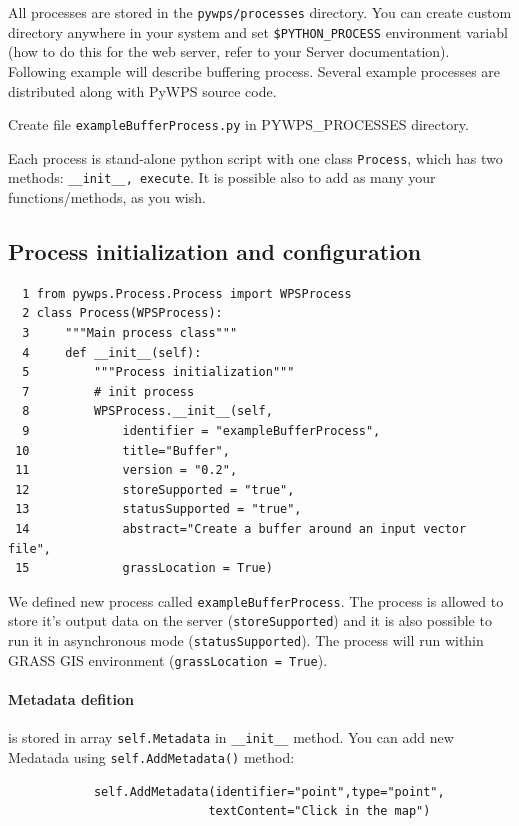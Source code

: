 \documentclass[a4paper,11pt]{article}
\begin{document}
All processes are stored in the \texttt{pywps/processes} directory. You can
create custom directory anywhere in your system and set
\texttt{\$PYTHON\_PROCESS} environment variabl (how to do this for the web
server, refer to your Server documentation). Following example will
describe buffering process.  Several example processes are distributed along with PyWPS source code.

Create file \texttt{exampleBufferProcess.py} in PYWPS\_PROCESSES directory.
    
Each process is stand-alone python script with one class \texttt{Process},
which has two methods: \texttt{\_\_init\_\_, execute}. It is possible also to add as 
many your functions/methods, as you wish.
    
\subsection{Process initialization and configuration}

\begin{verbatim}
  1 from pywps.Process.Process import WPSProcess                                
  2 class Process(WPSProcess):
  3     """Main process class"""
  4     def __init__(self):
  5         """Process initialization"""
  7         # init process
  8         WPSProcess.__init__(self,
  9             identifier = "exampleBufferProcess",
 10             title="Buffer",
 11             version = "0.2",
 12             storeSupported = "true",
 13             statusSupported = "true",
 14             abstract="Create a buffer around an input vector file",
 15             grassLocation = True)
\end{verbatim}

We defined new process called \texttt{exampleBufferProcess}. The process is allowed to
store it's output data on the server (\texttt{storeSupported}) and it is also possible to run it in
asynchronous mode (\texttt{statusSupported}). The process will run within
GRASS GIS environment (\texttt{grassLocation = True}).
     
\paragraph{Metadata defition} is stored in array \texttt{self.Metadata} in
\texttt{\_\_init\_\_} method. You can add new Medatada using
\texttt{self.AddMetadata()} method:
\begin{verbatim}
            self.AddMetadata(identifier="point",type="point",
                            textContent="Click in the map")
\end{verbatim}
\end{document}
